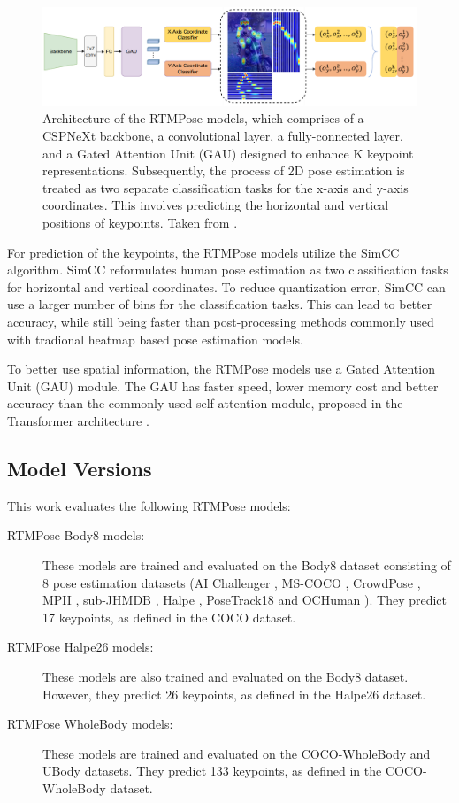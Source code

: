 \begin{figure}[htbp]
    \centering
    \includegraphics[width=\textwidth]{obrazky-figures/rtmpose_architecture.png}
    \caption{Architecture of the RTMPose models, which comprises of a CSPNeXt backbone, a convolutional layer, a fully-connected layer, and a Gated Attention Unit (GAU) designed to enhance K keypoint representations. Subsequently, the process of 2D pose estimation is treated as two separate classification tasks for the x-axis and y-axis coordinates. This involves predicting the horizontal and vertical positions of keypoints. Taken from \cite{rtmpose}.}
    \label{fig:rtmpose_architecture}
\end{figure}

For prediction of the keypoints, the RTMPose models utilize the SimCC \cite{simcc} algorithm. SimCC reformulates human pose estimation as two classification tasks for horizontal and vertical coordinates. To reduce quantization error, SimCC can use a larger number of bins for the classification tasks. This can lead to better accuracy, while still being faster than post-processing methods commonly used with tradional heatmap based pose estimation models.

To better use spatial information, the RTMPose models use a Gated Attention Unit (GAU) \cite{gau} module. The GAU has faster speed, lower memory cost and better accuracy than the commonly used self-attention module, proposed in the Transformer architecture \cite{attentionIsAllYouNeed}.

\subsection{Model Versions}
This work evaluates the following RTMPose models:

\begin{description}
    \item[RTMPose Body8 models:] These models are trained and evaluated on the Body8 dataset consisting of 8 pose estimation datasets (AI Challenger \cite{ai_challenger}, MS-COCO \cite{coco}, CrowdPose \cite{crowdpose}, MPII \cite{mpii}, sub-JHMDB \cite{JHMDB}, Halpe \cite{halpe}, PoseTrack18 \cite{posetrack} and OCHuman \cite{ochuman}). They predict 17 keypoints, as defined in the COCO dataset.
    \item[RTMPose Halpe26 models:] These models are also trained and evaluated on the Body8 dataset. However, they predict 26 keypoints, as defined in the Halpe26 dataset.
    \item[RTMPose WholeBody models:] These models are trained and evaluated on the COCO-WholeBody \cite{coco-wholebody} and UBody \cite{ubody} datasets. They predict 133 keypoints, as defined in the COCO-WholeBody dataset.
\end{description}




